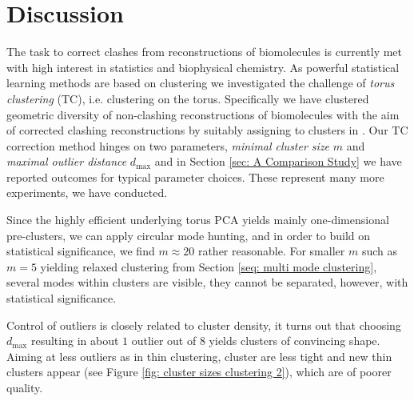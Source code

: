 \documentclass{llncs}
\begin{document}

\section{Discussion}


The task to correct clashes from reconstructions of biomolecules is currently met with high interest in statistics and biophysical chemistry.
As powerful statistical learning methods are based on clustering we investigated the challenge of \emph{torus clustering} (TC), i.e. clustering on the torus.
Specifically we have clustered geometric diversity of  non-clashing reconstructions of biomolecules with the aim of  corrected clashing reconstructions by suitably assigning to clusters in \cite{wiechers2021RNA}.
Our TC correction method hinges on two parameters, \emph{minimal cluster size} $m$ and  \emph{maximal outlier distance} $d_{\text{max}}$ and in Section \ref{sec: A Comparison Study} we have reported outcomes for typical parameter choices. These represent many more experiments, we have conducted. 

Since the highly efficient underlying torus PCA yields mainly one-dimensional pre-clusters, we can apply circular mode hunting, and in order to build on statistical significance, we find $m \approx 20$ rather reasonable. For smaller $m$ such as $m=5$ yielding relaxed clustering from Section \ref{seq: multi mode clustering}, several modes within clusters are visible, they cannot be separated, however, with statistical significance.

Control of outliers is closely related to cluster density, it turns out that choosing $d_{\text{max}}$ resulting in about $1$ outlier out of $8$  yields clusters of convincing shape. Aiming at less outliers as in thin clustering, cluster are less tight and new thin clusters appear (see Figure \ref{fig: cluster sizes clustering 2}), which are of poorer quality. 
\end{document}
